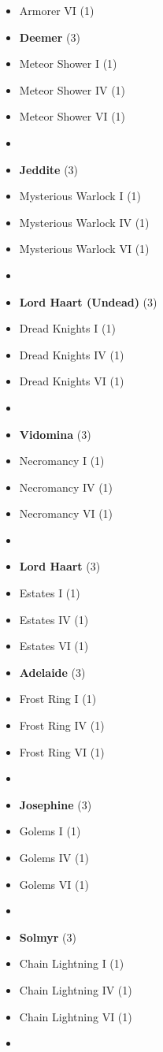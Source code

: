 \begin{multicols}{3}
\begin{itemize}[leftmargin=0pt, label={}, noitemsep]
  \item Armorer VI (1)
\columnbreak
  \item \textbf{Deemer} (3)
  \item Meteor Shower I (1)
  \item Meteor Shower IV (1)
  \item Meteor Shower VI (1)
  \item
  \item \textbf{Jeddite} (3)
  \item Mysterious Warlock I (1)
  \item Mysterious Warlock IV (1)
  \item Mysterious Warlock VI (1)
  \item
  \item \textbf{Lord Haart (Undead)} (3)
  \item Dread Knights I (1)
  \item Dread Knights IV (1)
  \item Dread Knights VI (1)
  \item
  \item \textbf{Vidomina} (3)
  \item Necromancy I (1)
  \item Necromancy IV (1)
  \item Necromancy VI (1)
  \item
  \item \textbf{Lord Haart} (3)
  \item Estates I (1)
  \item Estates IV (1)
  \item Estates VI (1)
\columnbreak
  \item \textbf{Adelaide} (3)
  \item Frost Ring I (1)
  \item Frost Ring IV (1)
  \item Frost Ring VI (1)
  \item
  \item \textbf{Josephine} (3)
  \item Golems I (1)
  \item Golems IV (1)
  \item Golems VI (1)
  \item
  \item \textbf{Solmyr} (3)
  \item Chain Lightning I (1)
  \item Chain Lightning IV (1)
  \item Chain Lightning VI (1)
  \item

\end{itemize}
\end{multicols}
